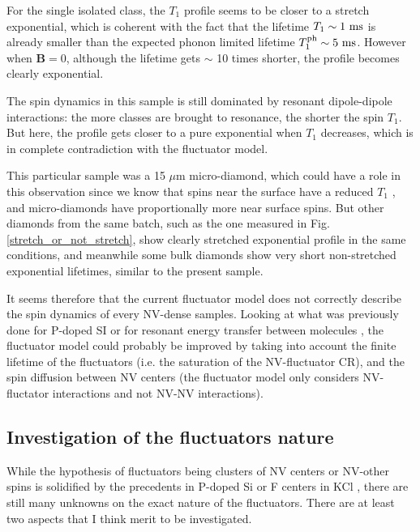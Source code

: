 \documentclass[a4paper,11pt]{report}
\begin{document}
\begin{refsection}
For the single isolated class, the $T_1$ profile seems to be closer to a stretch exponential, which is coherent with the fact that the lifetime $T_1 \sim 1\ \rm ms$ is already smaller than the expected phonon limited lifetime $T_1^{\rm ph} \sim 5\ \rm ms$. However when $\mathbf{B}=0$, although the lifetime gets $\sim$ 10 times shorter, the profile becomes clearly exponential. 

The spin dynamics in this sample is still dominated by resonant dipole-dipole interactions: the more classes are brought to resonance, the shorter the spin $T_1$. But here, the profile gets closer to a pure exponential when $T_1$ decreases, which is in complete contradiction with the fluctuator model.

This particular sample was a 15 $\mu$m micro-diamond, which could have a role in this observation since we know that spins near the surface have a reduced $T_1$ \citep{rosskopf2014investigation}, and micro-diamonds have proportionally more near surface spins. But other diamonds from the same batch, such as the one measured in Fig. \ref{stretch_or_not_stretch}, show clearly stretched exponential profile in the same conditions, and meanwhile some bulk diamonds show very short non-stretched exponential lifetimes, similar to the present sample.

It seems therefore that the current fluctuator model does not correctly describe the spin dynamics of every NV-dense samples. Looking at what was previously done for P-doped SI \citep{vugmeister1978spin} or for resonant energy transfer between molecules \citep{yokota1967effects}, the fluctuator model could probably be improved by taking into account the finite lifetime of the fluctuators (i.e. the saturation of the NV-fluctuator CR), and the spin diffusion between NV centers (the fluctuator model only considers NV-fluctator interactions and not NV-NV interactions).

\subsection{Investigation of the fluctuators nature}
While the hypothesis of fluctuators being clusters of NV centers or NV-other spins is solidified by the precedents in P-doped Si \citep{honig1960electron} or F centers in KCl \citep{warren1964spin}, there are still many unknowns on the exact nature of the fluctuators. There are at least two aspects that I think merit to be investigated.


\end{refsection}
\end{document}

